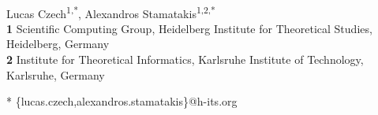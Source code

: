 \documentclass[10pt,letterpaper]{article}
\date{}
\begin{document}
\vspace*{0.2in}

\begin{flushleft}
{\Large
\textbf{}
}
\newline
\\
Lucas Czech\textsuperscript{1,*},
Alexandros Stamatakis\textsuperscript{1,2,*}
\\
\bigskip
\textbf{1} Scientific Computing Group, Heidelberg Institute for Theoretical Studies, Heidelberg, Germany
\\
\textbf{2} Institute for Theoretical Informatics, Karlsruhe Institute of Technology, Karlsruhe, Germany
\\
\bigskip

%
%





* \{lucas.czech,alexandros.stamatakis\}@h-its.org

\end{flushleft}
\end{document}
